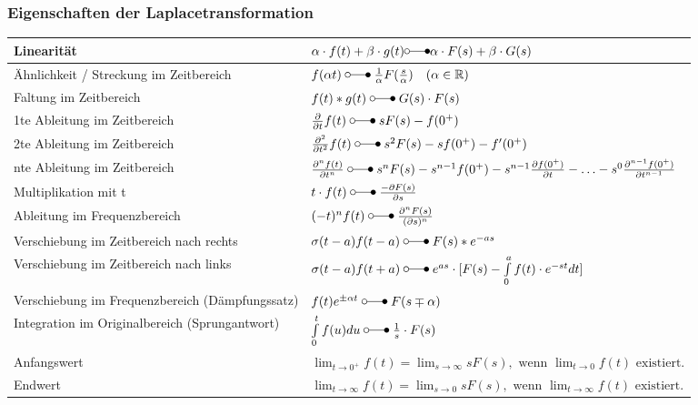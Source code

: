 \subsubsection{Eigenschaften der Laplacetransformation}
\renewcommand{\arraystretch}{1.5}
\begin{tabular}{|l|l|}
	\hline Linearität	& $\alpha\cdot f(t) + \beta\cdot g(t) \laplace \alpha\cdot F(s) + \beta\cdot G(s)$\\
	\hline Ähnlichkeit / Streckung im Zeitbereich & $f(\alpha t) \; \laplace \; \frac{1}{\alpha}F(\frac{s}{\alpha})\quad (\alpha \in \mathbb{R})$\\
	\hline Faltung im Zeitbereich & $f(t) * g(t) \; \laplace \; G(s) \cdot F(s)$\\
	\hline 1te Ableitung im Zeitbereich & $\frac{\partial}{\partial t}f(t) \; \laplace \; sF(s) - f(0^{+})$\\
	\hline 2te Ableitung im Zeitbereich & $\frac{\partial^{2}}{\partial t^{2}}f(t) \; \laplace \; s^{2}F(s) - sf(0^{+}) - f'(0^{+})$\\
	\hline nte Ableitung im Zeitbereich & $\frac{\partial^{n}f(t)}{\partial t^{n}} \; \laplace \; s^{n}F(s) - s^{n-1}f(0^{+}) - s^{n-1}\frac{\partial f(0^{+})}{\partial t}- \ldots - s^{0}\frac{\partial^{n-1}f(0^{+})}{\partial t^{n-1}}$\\
	\hline Multiplikation mit t & $t \cdot f(t) \; \laplace \; \frac{-\partial F(s)}{\partial s}$\\
	\hline Ableitung im Frequenzbereich & $(-t)^{n} f(t) \; \laplace \; \frac{\partial^{n} F(s)}{(\partial s)^{n}}$\\
	\hline Verschiebung im Zeitbereich nach rechts & $\sigma(t-a)f(t - a) \; \laplace \; F(s)*e^{-as}$ \\
	\hline Verschiebung im Zeitbereich nach links & $\sigma(t-a)f(t + a) \; \laplace \; e^{as} \cdot [F(s) - \int\limits_0^{a} f(t) \cdot e^{-st} dt]$\\
	\hline Verschiebung im Frequenzbereich (Dämpfungssatz) & $f(t)e^{\pm\alpha t} \; \laplace \; F(s\mp\alpha)$ \\
	\hline Integration im Originalbereich (Sprungantwort)& $\int\limits_0^t f(u)du \; \laplace \; \frac{1}{s}\cdot F(s)$ \\
	\hline Anfangswert & $\lim_{t\rightarrow 0^+} f(t) = \lim_{s\rightarrow \infty} sF(s),\text{~wenn
	}  \lim_{t\rightarrow 0} f(t)\text{~existiert}.$ \\
	\hline Endwert & $\lim_{t\rightarrow \infty} f(t) = \lim_{s\rightarrow 0} sF(s),\text{~wenn
	}  \lim_{t\rightarrow \infty} f(t)\text{~existiert}.$ \\
	\hline
\end{tabular}
\renewcommand{\arraystretch}{1}
